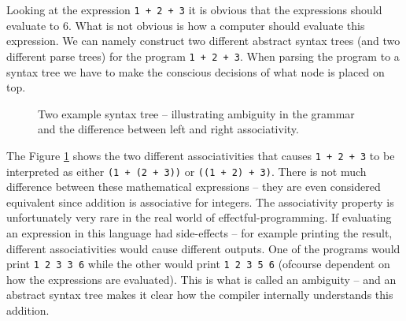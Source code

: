 Looking at the expression \verb!1 + 2 + 3! it is obvious that the expressions should evaluate to 6. What is not obvious is how a computer should evaluate this expression. We can namely construct two different abstract syntax trees (and two different parse trees) for the program \verb!1 + 2 + 3!. When parsing the program to a syntax tree we have to make the conscious decisions of what node is placed on top.


\begin{figure}
\centering
\begin{subfigure}{.5\textwidth}
\centering
{}
\end{subfigure}%
\begin{subfigure}{.5\textwidth}
\centering
{}
\end{subfigure}
  \caption{Two example syntax tree -- illustrating ambiguity in the grammar and the difference between left and right associativity.}
  \label{fig:astExpr}
\end{figure}

The Figure \ref{fig:astExpr} shows the two different associativities that causes \verb!1 + 2 + 3! to be interpreted as either \verb!(1 + (2 + 3))! or \verb!((1 + 2) + 3)!. There is not much difference between these mathematical expressions -- they are even considered equivalent since addition is associative for integers. The associativity property is unfortunately very rare in the real world of effectful-programming. If evaluating an expression in this language had side-effects -- for example printing the result, different associativities would cause different outputs. One of the programs would print \verb+1 2 3 3 6+ while the other would print \verb+1 2 3 5 6+ (ofcourse dependent on how the expressions are evaluated). This is what is called an ambiguity -- and an abstract syntax tree makes it clear how the compiler internally understands this addition.

